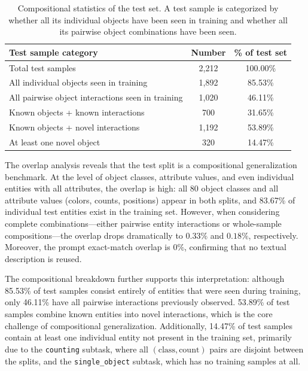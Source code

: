 \documentclass{article} %
\begin{document}
\begin{table}[t]
\centering
\caption{Compositional statistics of the test set. A test sample is categorized by whether all its individual objects have been seen in training and whether all its pairwise object combinations have been seen.}
\label{tab:comp-generalization}
\begin{tabular}{lcc}
\toprule
\textbf{Test sample category} & \textbf{Number} & \textbf{\% of test set} \\
\midrule
Total test samples & 2{,}212 & 100.00\% \\
All individual objects seen in training & 1{,}892 & 85.53\% \\
All pairwise object interactions seen in training & 1{,}020 & 46.11\% \\
Known objects + known interactions & 700 & 31.65\% \\
Known objects + novel interactions & 1{,}192 & 53.89\% \\
At least one novel object & 320 & 14.47\% \\
\bottomrule
\end{tabular}
\end{table}

The overlap analysis reveals that the test split is a compositional generalization benchmark. At the level of object classes, attribute values, and even individual entities with all attributes, the overlap is high: all 80 object classes and all attribute values (colors, counts, positions) appear in both splits, and 83.67\% of individual test entities exist in the training set. However, when considering complete combinations---either pairwise entity interactions or whole-sample compositions---the overlap drops dramatically to $0.33\%$ and $0.18\%$, respectively. Moreover, the prompt exact-match overlap is $0\%$, confirming that no textual description is reused.

The compositional breakdown further supports this interpretation: although 85.53\% of test samples consist entirely of entities that were seen during training, only 46.11\% have all pairwise interactions previously observed. 53.89\% of test samples combine known entities into novel interactions, which is the core challenge of compositional generalization. Additionally, 14.47\% of test samples contain at least one individual entity not present in the training set, primarily due to the \texttt{counting} subtask, where all $(\text{class}, \text{count})$ pairs are disjoint between the splits, and the \texttt{single\_object} subtask, which has no training samples at all.
\end{document}
